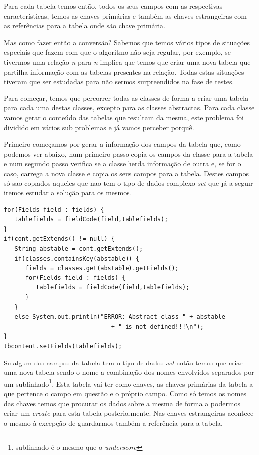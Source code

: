 \documentclass[a4paper]{article}
\begin{document}
\hspace{1cm}Para cada tabela temos então, todos os seus campos com as respectivas características, temos as chaves primárias e também as chaves estrangeiras com as referências para a tabela onde são chave primária.

\vspace{1cm}
\hspace{1cm}Mas como fazer então a conversão? Sabemos que temos vários tipos de situações especiais que fazem com que o algoritmo não seja regular, por exemplo, se tivermos uma relação {\em n} para {\em n} implica que temos que criar uma nova tabela que partilha informação com as tabelas presentes na relação. Todas estas situações tiveram que ser estudadas para não sermos surpreendidos na fase de testes.

\hspace{1cm}Para começar, temos que percorrer todas as classes de forma a criar uma tabela para cada uma destas classes, excepto para as classes abstractas. Para cada classe vamos gerar o conteúdo das tabelas que resultam da mesma, este problema foi dividido em vários sub problemas e já vamos perceber porquê.

\hspace{1cm}Primeiro começamos por gerar a informação dos campos da tabela que, como podemos ver abaixo, num primeiro passo copia os campos da classe para a tabela e num segundo passo verifica se a classe herda informação de outra e, se for o caso, carrega a nova classe e copia os seus campos para a tabela. Destes campos só são copiados aqueles que não tem o tipo de dados complexo {\em set} que já a seguir iremos estudar a solução para os mesmos.\\

\begin{small}
\begin{lstlisting}
for(Fields field : fields) {
   tablefields = fieldCode(field,tablefields);
}
if(cont.getExtends() != null) {
   String abstable = cont.getExtends();
   if(classes.containsKey(abstable)) {
      fields = classes.get(abstable).getFields();
      for(Fields field : fields) {
         tablefields = fieldCode(field,tablefields);
      }
   }
   else System.out.println("ERROR: Abstract class " + abstable
                              + " is not defined!!!\n");
}
tbcontent.setFields(tablefields);
\end{lstlisting}
\end{small}

\hspace{1cm}Se algum dos campos da tabela tem o tipo de dados {\em set} então temos que criar uma nova tabela sendo o nome a combinação dos nomes envolvidos separados por um sublinhado\footnote{sublinhado é o mesmo que o {\em underscore}}. Esta tabela vai ter como chaves, as chaves primárias da tabela a que pertence o campo em questão e o próprio campo. Como só temos os nomes das chaves temos que procurar os dados sobre a mesma de forma a podermos criar um {\em create} para esta tabela posteriormente. Nas chaves estrangeiras acontece o mesmo à excepção de guardarmos também a referência para a tabela.\\
\end{document}
